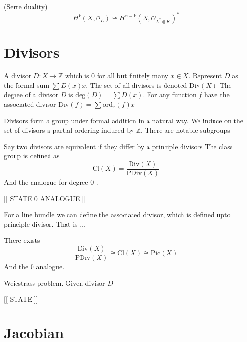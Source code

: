 \begin{theorem}
    (Serre duality) 
    \begin{equation}
        H^k ( X, \mathcal{O}_L ) \cong H^{n-k} (X, \mathcal{O}_{L ^* \otimes K}) ^* 
    \end{equation}
\end{theorem}



\section{Divisors} %

\begin{definition}
    A divisor $D : X \rightarrow \mathbb{Z} $ which is 0 for all but finitely many $x \in X$. 
    Represent $D$ as the formal sum $ \sum D(x) x $. 
    The set of all divisors is denoted $ \mathrm{Div}(X)$
    The degree of a divisor $D$ is $\mathrm{deg}(D)  = \sum D(x) $. 
    For any function $f$ have the associated divisor $ \mathrm{Div}(f) = \sum \mathrm{ord}_x(f) x $  
\end{definition}

Divisors form a group under formal addition in a natural way. 
We induce on the set of divisors a partial ordering induced by $\mathbb{Z} $. 
There are notable subgroups.

Say two divisors are equivalent if they differ by a principle divisors 
The class group is defined as 
\begin{equation}
    \mathrm{Cl} ( X) = \frac{\mathrm{Div }(X)}{\mathrm{PDiv}(X) }  
\end{equation}
And the analogue for degree 0 .

[[ STATE 0 ANALOGUE ]] 

For a line bundle we can define the associated divisor, which is defined upto principle divisor. 
That is ...
\begin{theorem}
 There exists 
    \begin{equation}
        \frac{\mathrm{Div}(X) }{\mathrm{PDiv}(X) }  \cong \mathrm{Cl}(X) \cong \mathrm{Pic}(X) 
    \end{equation}
    And the $0 $ analogue. 
\end{theorem}

Weiestrass problem. 
Given divisor $ D$ 

[[ STATE ]] 

\section{Jacobian} %

